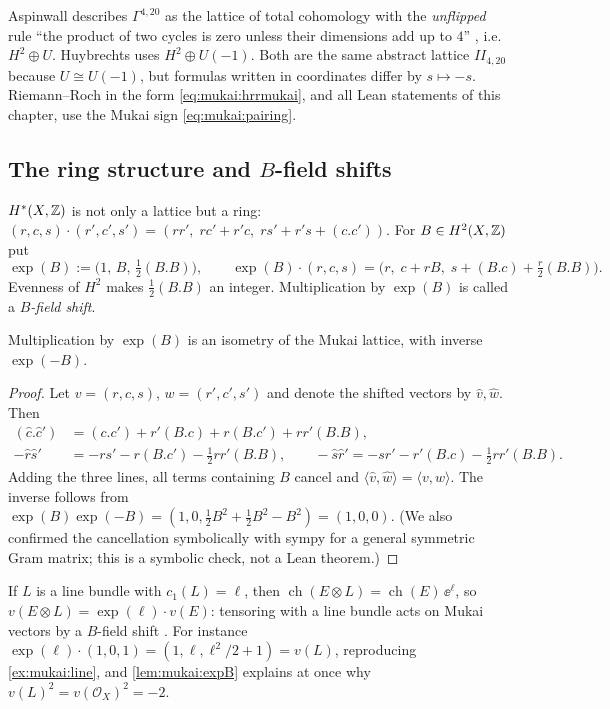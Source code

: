 \begin{pitfallbox}
Aspinwall describes $\Gamma^{4,20}$ as the lattice of total cohomology with the \emph{unflipped}
rule ``the product of two cycles is zero unless their dimensions add up to $4$''
, i.e.\ $H^2\oplus U$. Huybrechts uses $H^2\oplus U(-1)$. Both
are the same abstract lattice $II_{4,20}$ because $U\cong U(-1)$, but formulas written in
coordinates differ by $s\mapsto-s$. Riemann--Roch in the form \eqref{eq:mukai:hrrmukai}, and all
Lean statements of this chapter, use the Mukai sign \eqref{eq:mukai:pairing}.
\end{pitfallbox}

\subsection{The ring structure and \texorpdfstring{$B$}{B}-field shifts}
$H^*(X,\mathbb{Z})$ is not only a lattice but a ring: $(r,c,s)\cdot(r',c',s')=(rr',\;rc'+r'c,\;
rs'+r's+(c.c'))$. For $B\in H^2(X,\mathbb{Z})$ put
\begin{equation}\label{eq:mukai:expB}
  \exp(B):=\bigl(1,\,B,\,\tfrac12(B.B)\bigr),\qquad
  \exp(B)\cdot(r,c,s)=\bigl(r,\;c+rB,\;s+(B.c)+\tfrac r2(B.B)\bigr).
\end{equation}
Evenness of $H^2$ makes $\frac12(B.B)$ an integer. Multiplication by $\exp(B)$ is called a
\emph{$B$-field shift}.

\begin{lemma}\label{lem:mukai:expB}
Multiplication by $\exp(B)$ is an isometry of the Mukai lattice, with inverse $\exp(-B)$.
\end{lemma}
\begin{proof}
Let $v=(r,c,s)$, $w=(r',c',s')$ and denote the shifted vectors by $\hat v,\hat w$. Then
\begin{align*}
 (\hat c.\hat c')&=(c.c')+r'(B.c)+r(B.c')+rr'(B.B),\\
 -\hat r\hat s'&=-rs'-r(B.c')-\tfrac12rr'(B.B),\qquad
 -\hat s\hat r'=-sr'-r'(B.c)-\tfrac12rr'(B.B).
\end{align*}
Adding the three lines, all terms containing $B$ cancel and
$\langle\hat v,\hat w\rangle=\langle v,w\rangle$. The inverse follows from
$\exp(B)\exp(-B)=(1,0,\frac12B^2+\frac12B^2-B^2)=(1,0,0)$. (We also confirmed the cancellation
symbolically with sympy for a general symmetric Gram matrix; this is a symbolic check, not a
Lean theorem.)
\end{proof}
If $L$ is a line bundle with $c_1(L)=\ell$, then $\operatorname{ch}(E\otimes L)=\operatorname{ch}(E)
\,\ee^{\ell}$, so $v(E\otimes L)=\exp(\ell)\cdot v(E)$: tensoring with a line bundle acts on
Mukai vectors by a $B$-field shift . For instance
$\exp(\ell)\cdot(1,0,1)=(1,\ell,\ell^2/2+1)=v(L)$, reproducing \cref{ex:mukai:line}, and
\cref{lem:mukai:expB} explains at once why $v(L)^2=v(\mathcal O_X)^2=-2$.

